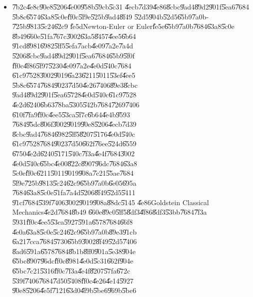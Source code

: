 \documentclass[12pt,a4paper]{article}
\begin{document}
\begin{itemize}
\item \U{7b2c}\U{4e8c}\U{90e8}\U{5206}\U{4e00}\U{958b}\U{59cb}\U{5c31}%
\U{4ecb}\U{7d39}\U{4e86}\U{8cbc}\U{9ad4}\U{89d2}\U{901f}\U{5ea6}\U{7684}%
\U{5b8c}\U{6574}\U{63a8}\U{5c0e}\U{ff0c}\U{5f9e}\U{525b}\U{9ad4}\U{8f49}%
\U{52d5}\U{904b}\U{52d5}\U{65b9}\U{7a0b}-\U{725b}\U{9813}\U{5c24}\U{62c9}%
\U{fe5d}Newton-Euler or Euler\U{fe5e}\U{65b9}\U{7a0b}\U{7684}\U{63a8}\U{5c0e}%
\U{8b49}\U{660e}\U{51fa}\U{767c}\U{3002}\U{63a5}\U{8457}\U{4ee5}\U{6b64}%
\U{91cd}\U{8981}\U{6982}\U{5ff5}\U{5efa}\U{7acb}\U{4e09}\U{7a2e}\U{7a4d}%
\U{5206}\U{8cbc}\U{9ad4}\U{89d2}\U{901f}\U{5ea6}\U{7684}\U{65b9}\U{5f0f}%
\U{ff0c}\U{4f86}\U{5f97}\U{5230}\U{4e09}\U{7a2e}\U{4e0d}\U{540c}\U{7684}%
\U{61c9}\U{7528}\U{3002}\U{9019}\U{6a23}\U{6211}\U{5011}\U{53ef}\U{4ee5}%
\U{5b8c}\U{6574}\U{7684}\U{9023}\U{7d50}\U{4e26}\U{7406}\U{89e3}\U{8cbc}%
\U{9ad4}\U{89d2}\U{901f}\U{5ea6}\U{5728}\U{4e0d}\U{540c}\U{61c9}\U{7528}%
\U{4e2d}\U{6240}\U{6b63}\U{78ba}\U{5305}\U{542b}\U{7684}\U{7269}\U{7406}%
\U{610f}\U{7fa9}\U{ff0c}\U{4ee5}\U{53ca}\U{5f7c}\U{6b64}\U{4e4b}\U{9593}%
\U{7684}\U{95dc}\U{806f}\U{3002}\U{9019}\U{90e8}\U{5206}\U{4ecb}\U{7d39}%
\U{8cbc}\U{9ad4}\U{7684}\U{6982}\U{5ff5}\U{8207}\U{5176}\U{4e0d}\U{540c}%
\U{61c9}\U{7528}\U{7684}\U{9023}\U{7d50}\U{662f}\U{76ee}\U{524d}\U{6559}%
\U{6750}\U{4e2d}\U{6240}\U{5171}\U{540c}\U{7f3a}\U{4e4f}\U{7684}\U{3002}%
\newline
\newline
\U{4e0d}\U{540c}\U{65bc}\U{4e00}\U{822c}\U{8907}\U{96dc}\U{7684}\U{63a8}%
\U{5c0e}\U{ff0c}\U{6211}\U{5011}\U{9019}\U{908a}\U{7c21}\U{55ae}\U{7684}%
\U{5f9e}\U{725b}\U{9813}\U{5c24}\U{62c9}\U{65b9}\U{7a0b}\U{6e05}\U{695a}%
\U{7684}\U{63a8}\U{5c0e}\U{51fa}\U{7a4d}\U{5206}\U{8f49}\U{52d5}\U{5411}%
\U{91cf}\U{7684}\U{539f}\U{7406}\U{3002}\U{9019}\U{908a}\U{88dc}\U{5145}%
\U{4e86}Goldstein Classical Mechanics\cite{goldstein}\U{4e2d}\U{7684}\U{8b49}%
\U{660e}\U{89c0}\U{5ff5}\U{8df3}\U{4f86}\U{8df3}\U{53bb}\U{7684}\U{7f3a}%
\U{5931}\U{ff0c}\U{4ee5}\U{53ca}\U{5927}\U{591a}\U{6578}\U{7684}\U{66f8}%
\U{4e0a}\U{63a8}\U{5c0e}\U{5c24}\U{62c9}\U{65b9}\U{7a0b}\U{89e3}\U{91cb}%
\U{6a21}\U{7cca}\U{7684}\U{5730}\U{65b9}\U{3002}\U{8f49}\U{52d5}\U{7406}%
\U{8ad6}\U{591a}\U{6578}\U{7684}\U{8b1b}\U{8ff0}\U{901a}\U{5e38}\U{904e}%
\U{65bc}\U{8907}\U{96dc}\U{ff0c}\U{8981}\U{4e0d}\U{5c31}\U{662f}\U{904e}%
\U{65bc}\U{7c21}\U{5316}\U{ff0c}\U{7f3a}\U{4e4f}\U{8207}\U{57fa}\U{672c}%
\U{539f}\U{7406}\U{7684}\U{7d50}\U{5408}\U{ff0c}\U{4e26}\U{4e14}\U{5927}%
\U{90e8}\U{5206}\U{4e5f}\U{7121}\U{63d0}\U{4f9b}\U{5be6}\U{969b}\U{5be6}%

\end{itemize}
\end{document}
